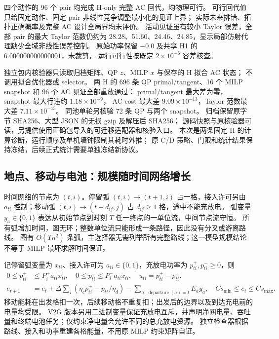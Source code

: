 \documentclass[UTF8,fontset=fandol,11pt,a4paper]{ctexart}
\begin{document}
四个动作的 96 个 pair 均完成 H-only 完整 AC 回代，均物理可行。
可行回代值只给固定动作、固定 pair 非线性竞争调整最小化的见证上界；
实际未来排错、拓扑正确概率及完整 AC 设计全局界均未评价。
活动见证虽有较小 Taylor 误差，全部 pair 的最大 Taylor 范数仍约为
28.28、51.60、24.46、24.85，显示局部仿射代理缺少全域非线性误差控制。
原始功率保留 $-0.0$ 及共享 H1 的 $6.000000000000001$，未裁剪，
运行可行性按既定 $2\times10^{-6}$ 容差核查。

独立包内核验器只读取归档矩阵、QP $z$、MILP $x$ 与保存的 H 拟合 AC 状态；
不调用拟合优化器或 selector。
两 H 的 696 条 QP primal/tangent、16 个 MILP snapshot 和 96 个 AC 见证全部重放通过：
primal/tangent 最大差为零，snapshot 最大行违约 $1.18\times10^{-9}$，
AC cost 最大差 $9.09\times10^{-13}$，Taylor 范数最大差 $7.11\times10^{-15}$。
同池单轮另核验 72 条 QP 与两个 snapshot。
归档保留原字节 SHA256、大型 JSON 的无损 gzip 及解压后 SHA256；
源码快照与原核验器可读，另提供使用正确包导入的可迁移适配器和核验入口。
本次是两条固定 H 的计算诊断，运行顺序及单机墙钟限制其耗时外推；
原 C/D 策略、门限和统计结果保持冻结，后续正式统计需要单独冻结新协议。

\subsection{地点、移动与电池：规模随时间网络增长}
时间网络的节点为 $(t,i)$。停留弧 $(t,i)\to(t+1,i)$ 占一格，接入许可另由 $a_{ti}$ 控制；移动弧 $(t,i)\to(t+d_{ij},j)$ 占 $d_{ij}\ge1$ 格，途中不能充放电。
弧变量 $y_a\in\{0,1\}$ 表达从初始节点到时刻 $T$ 任一终点的一单位流，中间节点流守恒。
所有弧增加时间，图无环；整数单位流只能形成一条路径，因此没有分叉或游离路线。
图有 $O(Tn^2)$ 条弧，主选择器无需列举所有完整路线；这一模型规模结论不等于 MILP 最坏求解时间保证。

记停留弧变量为 $x_{ti}$、接入许可为 $a_{ti}\in\{0,1\}$，充放电功率为 $p^+_{ti},p^-_{ti}\ge0$，则
\begin{align}
 0\le p^+_{ti}&\le P_i^+a_{ti}x_{ti},\quad
 0\le p^-_{ti}\le P_i^-a_{ti}x_{ti},\quad u_{ti}=p^+_{ti}-p^-_{ti},\label{eq:adapt-power}\\
 e_{t+1}&=e_t+\Delta\sum_i(\eta_cp^+_{ti}-p^-_{ti}/\eta_d)
 -\sum_{a:\,\operatorname{departure}(a)=t}E_ay_a,\quad
 Cs_{\min}\le e_t\le Cs_{\max}.\label{eq:adapt-energy}
\end{align}
移动能耗在出发格扣一次，后续移动格不重复扣；出发后的边界以及到达充电前的电量均受限。
V2G 版本另用二进制变量保证充放电互斥，并声明净网电量、吞吐量和终端电池任务；仅约束净电量会允许不同的总充放电资源。
独立检查器根据路线、接入和功率重建各格能量，不用原 MILP 约束矩阵自证。
\end{document}
